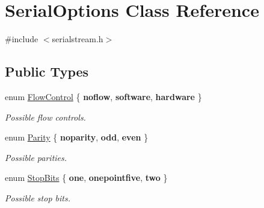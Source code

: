 \hypertarget{class_serial_options}{\section{Serial\-Options Class Reference}
\label{class_serial_options}
}


{\ttfamily \#include $<$serialstream.\-h$>$}

\subsection*{Public Types}
\begin{DoxyCompactItemize}
\item 
enum \hyperlink{class_serial_options_a747496555e093069ff4e943f38954c0f}{Flow\-Control} \{ {\bfseries noflow}, 
{\bfseries software}, 
{\bfseries hardware}
 \}
\begin{DoxyCompactList}\small\item\em Possible flow controls. \end{DoxyCompactList}\item 
enum \hyperlink{class_serial_options_af3761748c70f9d31c7c9f9368e15bf24}{Parity} \{ {\bfseries noparity}, 
{\bfseries odd}, 
{\bfseries even}
 \}
\begin{DoxyCompactList}\small\item\em Possible parities. \end{DoxyCompactList}\item 
enum \hyperlink{class_serial_options_acdb2c9f835d6efff77acdac0ca1dd0ea}{Stop\-Bits} \{ {\bfseries one}, 
{\bfseries onepointfive}, 
{\bfseries two}
 \}
\begin{DoxyCompactList}\small\item\em Possible stop bits. \end{DoxyCompactList}\end{DoxyCompactItemize}
